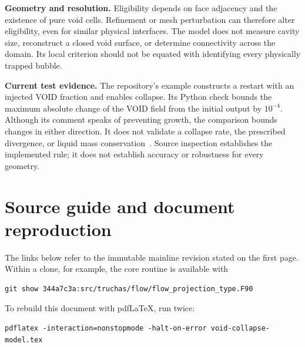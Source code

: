 \documentclass[11pt,letterpaper]{article}
\newcommand{\code}[1]{\texttt{\detokenize{#1}}}
\begin{document}
\textbf{Geometry and resolution.} Eligibility depends on face adjacency
and the existence of pure void cells. Refinement or mesh perturbation can
therefore alter eligibility, even for similar physical interfaces. The
model does not measure cavity size, reconstruct a closed void surface, or
determine connectivity across the domain. Its local criterion should not
be equated with identifying every physically trapped bubble.

\textbf{Current test evidence.} The repository's \code{test/void} example
constructs a restart with an injected VOID fraction and enables collapse.
Its Python check bounds the maximum absolute change of the VOID field from
the initial output by $10^{-4}$. Although its comment speaks of preventing
growth, the comparison bounds changes in either direction. It does not
validate a collapse rate, the prescribed divergence, or liquid mass
conservation~\cite{test}. Source inspection establishes the implemented
rule; it does not establish accuracy or robustness for every geometry.

\section{Source guide and document reproduction}

The links below refer to the immutable mainline revision stated on the
first page. Within a clone, for example, the core routine is available with
\begin{lstlisting}
git show 344a7c3a:src/truchas/flow/flow_projection_type.F90
\end{lstlisting}
To rebuild this document with pdfLaTeX, run twice:
\begin{lstlisting}
pdflatex -interaction=nonstopmode -halt-on-error void-collapse-model.tex
\end{lstlisting}
\end{document}
